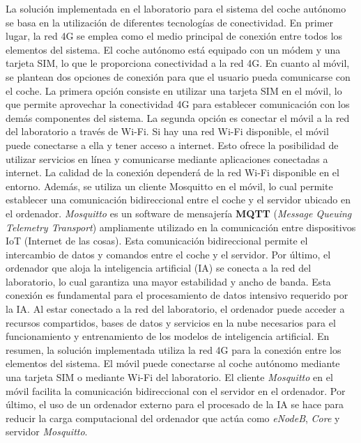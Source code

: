 La solución implementada en el laboratorio para el sistema del coche autónomo se basa en la utilización de diferentes tecnologías de conectividad. En primer lugar, la red 4G se emplea como el medio principal de conexión entre todos los elementos del sistema. El coche autónomo está equipado con un módem y una tarjeta SIM, lo que le proporciona conectividad a la red 4G.
En cuanto al móvil, se plantean dos opciones de conexión para que el usuario pueda comunicarse con el coche. La primera opción consiste en utilizar una tarjeta SIM en el móvil, lo que permite aprovechar la conectividad 4G para establecer comunicación con los demás componentes del sistema. La segunda opción es conectar el móvil a la red del laboratorio a través de Wi-Fi. Si hay una red Wi-Fi disponible, el móvil puede conectarse a ella y tener acceso a internet. Esto ofrece la posibilidad de utilizar servicios en línea y comunicarse mediante aplicaciones conectadas a internet. La calidad de la conexión dependerá de la red Wi-Fi disponible en el entorno.
Además, se utiliza un cliente Mosquitto en el móvil, lo cual permite establecer una comunicación bidireccional entre el coche y el servidor ubicado en el ordenador. \textit{Mosquitto} es un software de mensajería \textbf{MQTT} (\textit{Message Queuing Telemetry Transport}) ampliamente utilizado en la comunicación entre dispositivos IoT (Internet de las cosas). Esta comunicación bidireccional permite el intercambio de datos y comandos entre el coche y el servidor.
Por último, el ordenador que aloja la inteligencia artificial (IA) se conecta a la red del laboratorio, lo cual garantiza una mayor estabilidad y ancho de banda. Esta conexión es fundamental para el procesamiento de datos intensivo requerido por la IA. Al estar conectado a la red del laboratorio, el ordenador puede acceder a recursos compartidos, bases de datos y servicios en la nube necesarios para el funcionamiento y entrenamiento de los modelos de inteligencia artificial.
En resumen, la solución implementada utiliza la red 4G para la conexión entre los elementos del sistema. El móvil puede conectarse al coche autónomo mediante una tarjeta SIM o mediante Wi-Fi del laboratorio. El cliente \textit{Mosquitto} en el móvil facilita la comunicación bidireccional con el servidor en el ordenador. Por último, el uso de un ordenador externo para el procesado de la IA se hace para reducir la carga computacional del ordenador que actúa como \textit{eNodeB}, \textit{Core} y servidor \textit{Mosquitto}.

